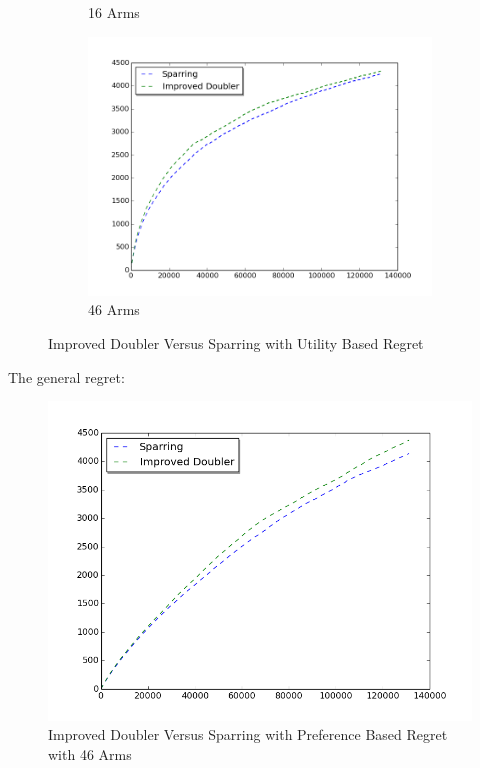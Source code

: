 \documentclass{llncs}
\begin{document}
\begin{figure}[h!]
\begin{subfigure}{.5\textwidth}
  \caption{16 Arms}
  \label{fig:sub2}
\end{subfigure}
\begin{subfigure}{.5\textwidth}
  \centering
  \includegraphics[scale=0.3]{figures/improved_doubler_sparring_MQ2007_46arms.png}
  \caption{46 Arms}
  \label{fig:sub2}
\end{subfigure}
\caption{Improved Doubler Versus Sparring with Utility Based Regret}
\label{fig:test}
\end{figure}

The general regret:
\begin{figure}[h!]
  \centering
     \includegraphics[scale=0.3]{figures/improved_doubler_sparring_MQ2007_general.png} 
  \caption{Improved Doubler Versus Sparring with Preference Based Regret with 46 Arms}
\end{figure}
\newpage
\end{document}
